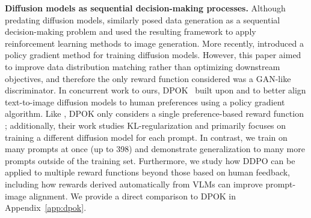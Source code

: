 \textbf{Diffusion models as sequential decision-making processes.}
Although predating diffusion models, \citet{bachman2015data} similarly posed data generation as a sequential decision-making problem and used the resulting framework to apply reinforcement learning methods to image generation.
More recently, \citet{fan2023sft} introduced a policy gradient method for training diffusion models. However, this paper aimed to improve data distribution matching rather than optimizing downstream objectives, and therefore the only reward function considered was a GAN-like discriminator.
In concurrent work to ours, DPOK~\citep{fan2023dpok} built upon \citet{fan2023sft} and \citet{lee2023aligning} to better align text-to-image diffusion models to human preferences using a policy gradient algorithm. 
Like \citet{lee2023aligning}, DPOK only considers a single preference-based reward function \citep{xu2023imagereward}; additionally, their work studies KL-regularization and primarily focuses on training a different diffusion model for each prompt.
In contrast, we train on many prompts at once (up to 398) and demonstrate generalization to many more prompts outside of the training set. Furthermore, we study how DDPO can be applied to multiple reward functions beyond those based on human feedback, including how rewards derived automatically from VLMs can improve prompt-image alignment. We provide a direct comparison to DPOK in Appendix~\ref{app:dpok}.

